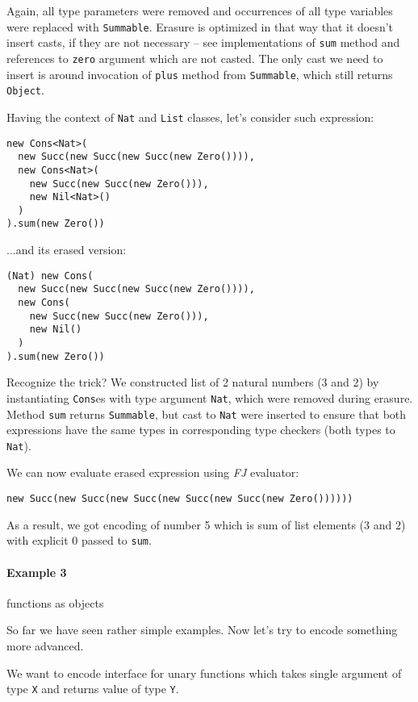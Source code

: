 \documentclass{article}[12pt]
\begin{document}
Again, all type parameters were removed and occurrences of all
type variables were replaced with \texttt{Summable}. Erasure is
optimized in that way that it doesn't insert casts, if they are
not necessary -- see implementations of \texttt{sum} method
and references to \texttt{zero} argument which are not casted.
The only cast we need to insert is around invocation of \texttt{plus}
method from \texttt{Summable}, which still returns \texttt{Object}.

Having the context of \texttt{Nat} and \texttt{List} classes,
let's consider such expression:

\begin{verbatim}
new Cons<Nat>(
  new Succ(new Succ(new Succ(new Zero()))),
  new Cons<Nat>(
    new Succ(new Succ(new Zero())),
    new Nil<Nat>()
  )
).sum(new Zero())
\end{verbatim}
...and its erased version:
\begin{verbatim}
(Nat) new Cons(
  new Succ(new Succ(new Succ(new Zero()))),
  new Cons(
    new Succ(new Succ(new Zero())),
    new Nil()
  )
).sum(new Zero())
\end{verbatim}

Recognize the trick? We constructed list of 2 natural numbers
(3 and 2) by instantiating \texttt{Cons}es with type argument
\texttt{Nat}, which were removed during erasure. Method
\texttt{sum} returns \texttt{Summable}, but cast to
\texttt{Nat} were inserted to ensure that both expressions have
the same types in corresponding type checkers (both types
to \texttt{Nat}).

We can now evaluate erased expression using \emph{FJ} evaluator:

\begin{verbatim}
new Succ(new Succ(new Succ(new Succ(new Succ(new Zero())))))
\end{verbatim}

As a result, we got encoding of number 5 which is sum of list
elements (3 and 2) with explicit 0 passed to \texttt{sum}.

\paragraph{Example 3} functions as objects

So far we have seen rather simple examples. Now let's try to
encode something more advanced.

We want to encode interface for unary functions which takes
single argument of type \texttt{X} and returns value
of type \texttt{Y}.
\end{document}
